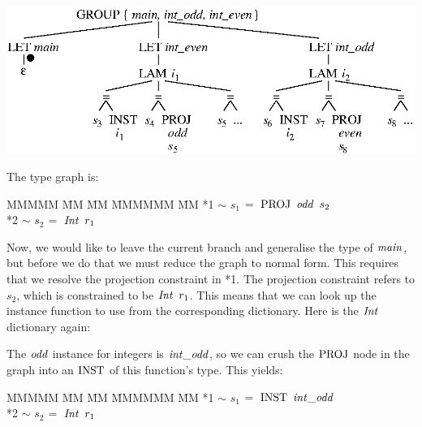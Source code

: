 \begin{center}
\includegraphics{3-Inference/fig/ordering/tree-main-gen}
\end{center}
\vspace{-2em}
The type graph is:
\begin{tabbing}
MMMMM	\= MM 	\= MM 		\= MMMMMM 	\= MM \kill
	\> *1	\> $\sim$	\> $s_1$	\> $= \ \textrm{PROJ} \ \operatorname{\mathit{odd}} \ s_2$ \\
	\> *2	\> $\sim$	\> $s_2$	\> $= \ \operatorname{\mathit{Int}} \ r_1$
\end{tabbing}
Now, we would like to leave the current branch and generalise the type of $\operatorname{\mathit{main}}$, but before we do that we must reduce the graph to normal form. This requires that we resolve the projection constraint in *1. The projection constraint refers to $s_2$, which is constrained to be $\iInt \ r_1$. This means that we can look up the instance function to use from the corresponding dictionary. Here is the $\operatorname{\mathit{Int}}$ dictionary again:


The $\operatorname{\mathit{odd}}$ instance for integers is $\operatorname{\mathit{int\_odd}}$, so we can crush the $\textrm{PROJ}$ node in the graph into an $\textrm{INST}$ of this function's type. This yields:
\begin{tabbing}
MMMMM	\= MM 	\= MM 		\= MMMMMM 	\= MM \kill
	\> *1	\> $\sim$	\> $s_1$	\> $= \ \textrm{INST} \ \operatorname{\mathit{int\_odd}}$ \\
	\> *2	\> $\sim$	\> $s_2$	\> $= \ \operatorname{\mathit{Int}} \ r_1$
\end{tabbing}

